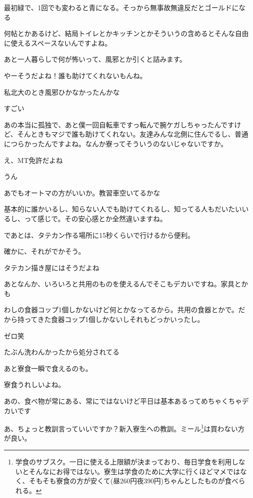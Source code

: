 \begin{multicols}{3}
最初緑で、1回でも変わると青になる。そっから無事故無違反だとゴールドになる

何帖とかあるけど、結局トイレとかキッチンとかそういうの含めるとそんな自由に使えるスペースないんですよね。


あと一人暮らしで何が怖いって、風邪とか引くと詰みます。

やーそうだよね！誰も助けてくれないもんね。

私北大のとき風邪ひかなかったんかな

すごい

あの本当に孤独で、あと僕一回自転車ですっ転んで腕ケガしちゃったんですけど、そんときもマジで誰も助けてくれない。友達みんな北側に住んでるし、普通につらかったんですよね。なんか寮ってそういうのないじゃないですか。

え、MT免許だよね

うん

あでもオートマの方がいいか。教習車空いてるかな

基本的に誰かいるし、知らない人でも助けてくれるし、知ってる人もだいたいいるし、って感じで。その安心感とか全然違いますね。


であとは、タテカン作る場所に15秒くらいで行けるから便利。

確かに、それがでかそう。

タテカン描き屋にはそうだよね

あとなんか、いろいろと共用のものを使えるんでそこもデカいですね。家具とかも

わしの食器コップ1個しかないけど何とかなってるから。共用の食器とかで。だから持ってきた食器コップ1個しかないしそれもどっかいったし。

ゼロ笑

たぶん洗わんかったから処分されてる

あと寮食一瞬で食えるのも。

寮食うれしいよね。

あの、食べ物が常にある、常にではないけど平日は基本あるってめちゃくちゃデカいです

あ、ちょっと教訓言っていいですか？新入寮生への教訓。ミール\footnote{学食のサブスク。一日に使える上限額が決まっており、毎日学食を利用しないとそんなにお得ではない。寮生は学食のために大学に行くほどマメではなく、そもそも寮食の方が安くて(昼260円夜390円)ちゃんとしたものが食べられる。}は買わない方が良い。


\end{multicols}
